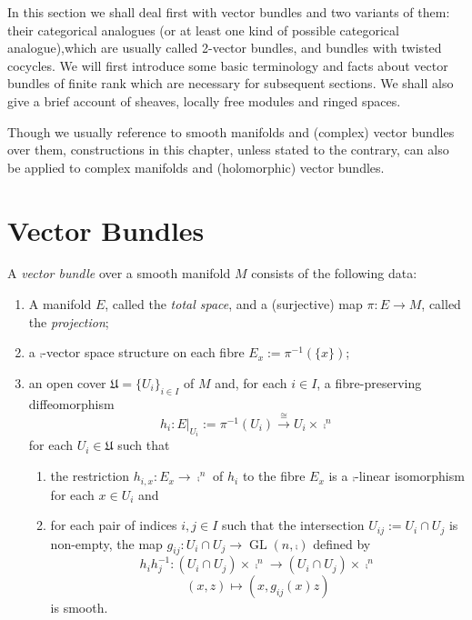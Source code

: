 
\vspace{250pt}

In this section we shall deal first with vector bundles and two variants of them: their categorical analogues (or at least one kind of possible categorical analogue),which are usually called 2-vector bundles, and bundles with twisted cocycles. We will first introduce some basic terminology and facts about vector bundles of finite rank which are necessary for subsequent sections. We shall also give a brief account of sheaves, locally free modules and ringed spaces. 

Though we usually reference to smooth manifolds and (complex) vector bundles over them, constructions in this chapter, unless stated to the contrary, can also be applied to complex manifolds and (holomorphic) vector bundles.

\section{Vector Bundles}
\label{vector_bundles}

A \emph{vector bundle} over a smooth manifold $M$ consists of the
following data:
\begin{enumerate}
\item A manifold $E$, called the \emph{total space}, and a
  (surjective) map $\pi :E\to M$, called the \emph{projection};
\item a $\comp$-vector space structure on each fibre
  $E_x:=\pi^{-1}(\{x\})$;
\item an open cover $\mathfrak{U}=\{U_i\}_{i\in I}$ of $M$ and, for
  each $i\in I$, a fibre-preserving
  diffeomorphism
  $$h_i:E|_{U_i}:=\pi^{-1}(U_i)\stackrel{\cong}{\longrightarrow}U_i\times
  \comp^n$$ for each $U_i\in \mathfrak{U}$ such that
  \begin{enumerate}
  \item the restriction $h_{i,x}:E_x\to \comp^n$ of $h_i$ to the fibre
    $E_x$ is a $\comp$-linear isomorphism for each $x\in U_i$ and
  \item for each pair of indices $i,j\in I$ such that the intersection
    $U_{ij}:=U_i\cap U_j$ is non-empty, the map
    $g_{ij}:U_i\cap U_j\to \operatorname{GL}(n,\comp )$ defined by
$$h_ih_j^{-1}:(U_i\cap U_j)\times \comp^n\longrightarrow(U_i\cap U_j)\times \comp^n$$
$$(x,z)\longmapsto (x,g_{ij}(x)z)$$
is smooth.
\end{enumerate}
\end{enumerate}

